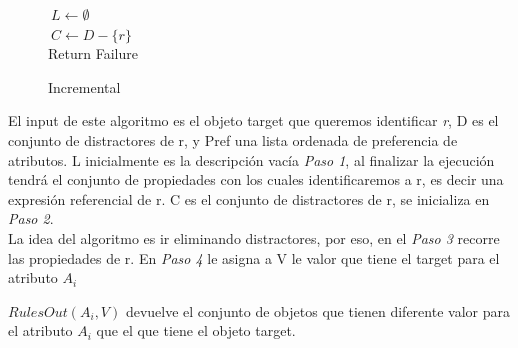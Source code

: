 

\begin{figure}
\small
\centering
\begin{algorithm}[H]
\dontprintsemicolon
\caption{Incremental}\label{algo:incremental}

$\ L \leftarrow \emptyset $ \\
$\ C \leftarrow D - \{r\} $ \\


Return Failure 
\end{algorithm}
\end{figure}

El input de este algoritmo es el objeto target que queremos identificar {\it r}, D es el conjunto de distractores de r,
y Pref una lista ordenada de preferencia de atributos.
L inicialmente es la descripci\'on vac\'{i}a {\it Paso 1}, al finalizar la ejecuci\'on tendr\'a el conjunto de propiedades con los cuales identificaremos a r, es decir una expresi\'on referencial de r. C es el conjunto de distractores de r, se inicializa en {\it Paso 2}.\\

La idea del algoritmo es ir eliminando distractores, por eso, en el {\it Paso 3} recorre las propiedades de r. En {\it Paso 4} le asigna a V le valor que tiene el target para el atributo $A_{i}$

$RulesOut(A_{i},V)$ devuelve el conjunto de objetos que tienen diferente valor para el atributo $A_{i}$ que el que tiene el objeto target.

